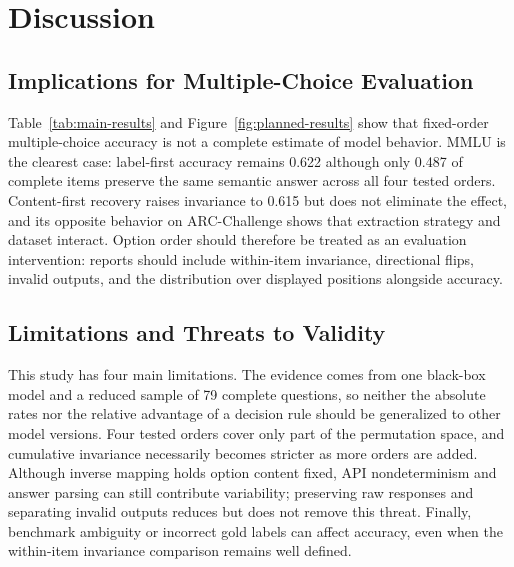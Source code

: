 \section{Discussion}

\label{sec:discussion}


\subsection{Implications for Multiple-Choice Evaluation}

Table~\ref{tab:main-results} and Figure~\ref{fig:planned-results} show that fixed-order multiple-choice accuracy is not a complete estimate of model behavior. MMLU is the clearest case: label-first accuracy remains 0.622 although only 0.487 of complete items preserve the same semantic answer across all four tested orders. Content-first recovery raises invariance to 0.615 but does not eliminate the effect, and its opposite behavior on ARC-Challenge shows that extraction strategy and dataset interact. Option order should therefore be treated as an evaluation intervention: reports should include within-item invariance, directional flips, invalid outputs, and the distribution over displayed positions alongside accuracy.


\subsection{Limitations and Threats to Validity}

This study has four main limitations. The evidence comes from one black-box model and a reduced sample of 79 complete questions, so neither the absolute rates nor the relative advantage of a decision rule should be generalized to other model versions. Four tested orders cover only part of the permutation space, and cumulative invariance necessarily becomes stricter as more orders are added. Although inverse mapping holds option content fixed, API nondeterminism and answer parsing can still contribute variability; preserving raw responses and separating invalid outputs reduces but does not remove this threat. Finally, benchmark ambiguity or incorrect gold labels can affect accuracy, even when the within-item invariance comparison remains well defined.

